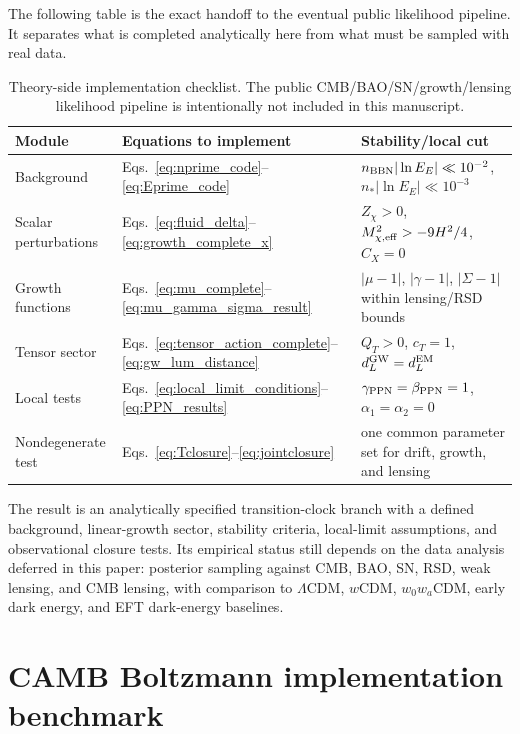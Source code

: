 \documentclass[aps,prd,reprint,nofootinbib,superscriptaddress,longbibliography]{revtex4-2}
\newcommand{\LCDM}{$\Lambda$CDM}
\begin{document}
The following table is the exact handoff to the eventual public likelihood pipeline.  It separates what is completed analytically here from what must be sampled with real data.
\begin{table}[t]
\footnotesize
\caption{Theory-side implementation checklist.  The public CMB/BAO/SN/growth/lensing likelihood pipeline is intentionally not included in this manuscript.}
\begin{ruledtabular}
\begin{tabular}{lll}
Module & Equations to implement & Stability/local cut \\
\hline
Background & Eqs.~\eqref{eq:nprime_code}--\eqref{eq:Eprime_code} & $n_{\rm BBN}|\ln E_E|\ll10^{-2}$, $n_*|\ln E_E|\ll10^{-3}$ \\
Scalar perturbations & Eqs.~\eqref{eq:fluid_delta}--\eqref{eq:growth_complete_x} & $Z_\chi>0$, $M_{\chi,\rm eff}^2>-9H^2/4$, $C_X=0$ \\
Growth functions & Eqs.~\eqref{eq:mu_complete}--\eqref{eq:mu_gamma_sigma_result} & $|\mu-1|$, $|\gamma-1|$, $|\Sigma-1|$ within lensing/RSD bounds \\
Tensor sector & Eqs.~\eqref{eq:tensor_action_complete}--\eqref{eq:gw_lum_distance} & $Q_T>0$, $c_T=1$, $d_L^{\rm GW}=d_L^{\rm EM}$ \\
Local tests & Eqs.~\eqref{eq:local_limit_conditions}--\eqref{eq:PPN_results} & $\gamma_{\rm PPN}=\beta_{\rm PPN}=1$, $\alpha_1=\alpha_2=0$ \\
Nondegenerate test & Eqs.~\eqref{eq:Tclosure}--\eqref{eq:jointclosure} & one common parameter set for drift, growth, and lensing \\
\end{tabular}
\end{ruledtabular}
\label{tab:implementation_checklist}
\end{table}

The result is an analytically specified transition-clock branch with a defined background, linear-growth sector, stability criteria, local-limit assumptions, and observational closure tests.  Its empirical status still depends on the data analysis deferred in this paper: posterior sampling against CMB, BAO, SN, RSD, weak lensing, and CMB lensing, with comparison to \LCDM{}, $w$CDM, $w_0w_a$CDM, early dark energy, and EFT dark-energy baselines.

\section{CAMB Boltzmann implementation benchmark}
\label{sec:camb-boltzmann-benchmark}
\end{document}
